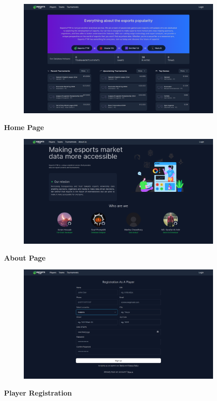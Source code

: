 \begin{center}

    \begin{figure}[H]
        \centering
        \includegraphics[width=0.9\textwidth]{Chapter 3/UI/HomePage.png}
        \label{fig:Home Page}
    \end{figure}
    \textbf{Home Page}



    \begin{figure}[H]
        \centering
        \includegraphics[width=0.9\textwidth]{Chapter 3/UI/about.png}
        \label{fig:about-Page}
    \end{figure}
    \textbf{About Page}


    \clearpage
    \begin{figure}[H]
        \centering
        \includegraphics[width=0.9\textwidth]{Chapter 3/UI/reg-page.png}
        \label{fig:Registration}
    \end{figure}
    \textbf{Player Registration}



\end{center}
